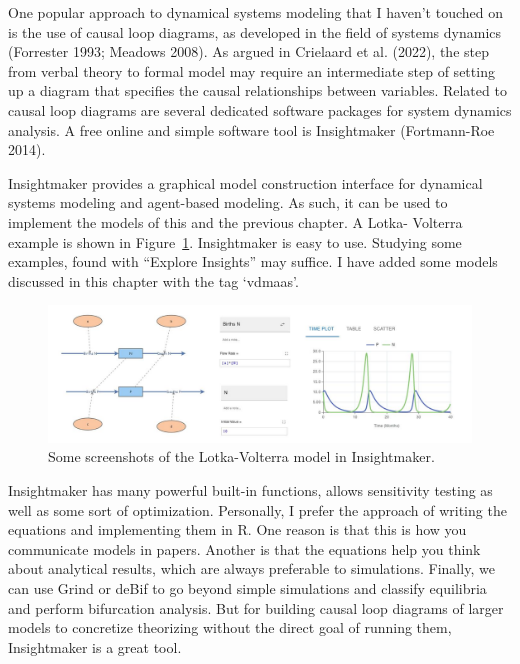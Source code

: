\documentclass[
  a4paper,
  DIV=11,
  numbers=noendperiod,
  oneside]{scrreprt}
\begin{document}
One popular approach to dynamical systems modeling that I haven't
touched on is the use of causal loop diagrams, as developed in the field
of systems dynamics (Forrester 1993; Meadows 2008). As argued in
Crielaard et al. (2022), the step from verbal theory to formal model may
require an intermediate step of setting up a diagram that specifies the
causal relationships between variables. Related to causal loop diagrams
are several dedicated software packages for system dynamics analysis. A
free online and simple software tool is Insightmaker (Fortmann-Roe
2014).

Insightmaker provides a graphical model construction interface for
dynamical systems modeling and agent-based modeling. As such, it can be
used to implement the models of this and the previous chapter. A Lotka-
Volterra example is shown in Figure~\ref{fig-ch4n-img21-old-69}.
Insightmaker is easy to use. Studying some examples, found with
``Explore Insights'' may suffice. I have added some models discussed in
this chapter with the tag `vdmaas'.

\begin{figure}

{\centering \includegraphics{media/ch4n/image21.jpg}

}

\caption{\label{fig-ch4n-img21-old-69}Some screenshots of the
Lotka-Volterra model in Insightmaker.}

\end{figure}

Insightmaker has many powerful built-in functions, allows sensitivity
testing as well as some sort of optimization. Personally, I prefer the
approach of writing the equations and implementing them in R. One reason
is that this is how you communicate models in papers. Another is that
the equations help you think about analytical results, which are always
preferable to simulations. Finally, we can use Grind or deBif to go
beyond simple simulations and classify equilibria and perform
bifurcation analysis. But for building causal loop diagrams of larger
models to concretize theorizing without the direct goal of running them,
Insightmaker is a great tool.
\end{document}

